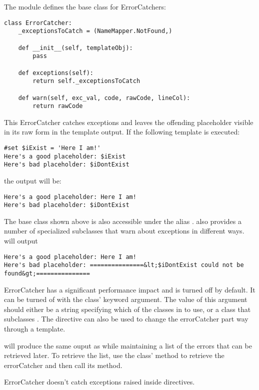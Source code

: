 The  module defines the base class for
ErrorCatchers:

\begin{verbatim}
class ErrorCatcher:
    _exceptionsToCatch = (NameMapper.NotFound,)
    
    def __init__(self, templateObj):
        pass
    
    def exceptions(self):
        return self._exceptionsToCatch
    
    def warn(self, exc_val, code, rawCode, lineCol):
        return rawCode
\end{verbatim}    

This ErrorCatcher catches  exceptions and leaves the
offending placeholder visible in its raw form in the template output.  If the
following template is executed:
\begin{verbatim}
#set $iExist = 'Here I am!'
Here's a good placeholder: $iExist
Here's bad placeholder: $iDontExist
\end{verbatim}    

the output will be:
\begin{verbatim}
Here's a good placeholder: Here I am!
Here's bad placeholder: $iDontExist
\end{verbatim}

The base class shown above is also accessible under the alias
.   also provides a
number of specialized subclasses that warn about exceptions in different ways.
 will output

\begin{verbatim}
Here's a good placeholder: Here I am!
Here's bad placeholder: ===============&lt;$iDontExist could not be found&gt;===============
\end{verbatim}

ErrorCatcher has a significant performance impact and is turned off by default.
It can be turned of with the  class' 
keyword argument.  The value of this argument should either be a string
specifying which of the classes in  to use, or a
class that subclasses . The
 directive can also be used to change the errorCatcher part
way through a template.

 will produce the same ouput as
 while maintaining a list of the errors that can be retrieved later.
To retrieve the list, use the  class' 
method to retrieve the errorCatcher and then call its  method.

ErrorCatcher doesn't catch exceptions raised inside directives. 







